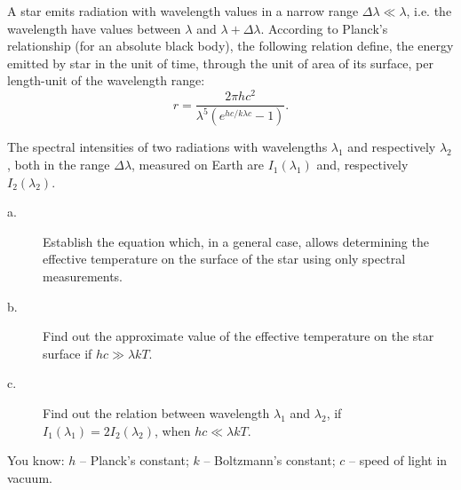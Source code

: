 A star emits radiation with wavelength values in a narrow range
$\Delta\lambda \ll \lambda$, i.e. the wavelength have values between
$\lambda$ and $\lambda + \Delta\lambda$. According to Planck's relationship
(for an absolute black body), the following relation define, the energy
emitted by star in the unit of time, through the unit of area of its
surface, per length-unit of the wavelength range:
\[ r = \frac{2\pi h c^2}{\lambda^5\left(e^{hc/k\lambda c} - 1\right)}. \]

The spectral intensities of two radiations with wavelengths $\lambda_1$ and
respectively $\lambda_2$, both in the range $\Delta\lambda$, measured on
Earth are $I_1(\lambda_1)$ and, respectively $I_2(\lambda_2)$.
\begin{description}
\item[a.] Establish the equation which, in a general case, allows
  determining the effective temperature on the surface of the star using
  only spectral measurements.
\item[b.] Find out the approximate value of the effective temperature on the
  star surface if $hc \gg \lambda k T$.
\item[c.] Find out the relation between wavelength $\lambda_1$ and
  $\lambda_2$, if $I_1(\lambda_1) = 2 I_2(\lambda_2)$, when
  $hc \ll \lambda k T$.
\end{description}
You know: $h$ -- Planck's constant; $k$ -- Boltzmann's constant; $c$ --
speed of light in vacuum.
